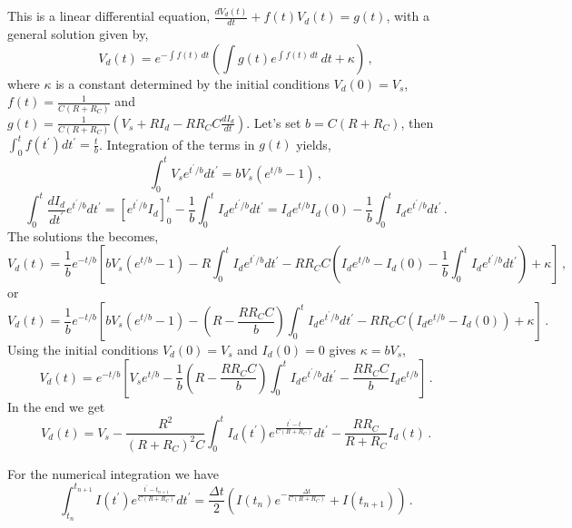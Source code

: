 \documentclass[a4paper,10pt]{article}
\numberwithin{equation}{section}
\begin{document}
This is a linear differential equation, \( \frac{d V_d(t)}{dt}+f(t)V_d(t)=g(t)\), with a general solution given by,
\begin{equation}
  V_d(t)=e^{-\int f(t)\,dt}\left(\int g(t)e^{\int f(t)\,dt}\,dt+\kappa \right)\, ,
\end{equation}
where \(\kappa\) is a constant determined by the initial conditions \(V_d(0) = V_s\),
\({ f(t) = \frac{1}{C(R+R_C)} }\) and\\ \(g(t) = \frac{1}{C(R+R_C)}\left( V_s + RI_d - RR_C C\frac{d I_d}{dt} \right)\).
Let's set \(b = C(R+R_C)\), then \(\int_0^t f(t^\prime) dt^\prime = \frac{t}{b}\).
Integration of the terms in \(g(t)\) yields,
\begin{equation}
  \int_0^t V_s e^{t^\prime/b} dt^\prime = bV_s(e^{t/b} - 1)\, ,
\end{equation}
\begin{equation}
  \int_0^t \frac{dI_d}{dt^\prime} e^{t^\prime/b} dt^\prime = \left[ e^{t^\prime/b}I_d \right]_0^t - \frac{1}{b}\int_0^t I_d e^{t^\prime/b} dt^\prime
  = I_d e^{t/b} I_d(0) - \frac{1}{b}\int_0^t I_d e^{t^\prime/b} dt^\prime\, .
\end{equation}
The solutions the becomes,
\begin{equation}
  V_d(t) = \frac{1}{b} e^{-t/b}\left[ bV_s\left( e^{t/b} - 1 \right) - R\int_0^t I_d e^{t^\prime/b}dt^\prime - RR_C C \left( I_d e^{t/b} -I_d(0) - \frac{1}{b}\int_0^t I_d e^{t^\prime/b} dt^\prime \right) + \kappa \right]\, ,
\end{equation}
or
\begin{equation}
  V_d(t) = \frac{1}{b} e^{-t/b}\left[ bV_s\left( e^{t/b} - 1 \right) - \left( R - \frac{RR_C C}{b} \right)\int_0^t I_d e^{t^\prime/b}dt^\prime - RR_C C \left( I_d e^{t/b} -I_d(0) \right) + \kappa \right]\, .
\end{equation}
Using the initial conditions \(V_d(0) = V_s\) and \(I_d(0) = 0\) gives \(\kappa = bV_s\),
\begin{equation}
  V_d(t) = e^{-t/b}\left[ V_s e^{t/b} - \frac{1}{b}\left( R - \frac{RR_C C}{b} \right)\int_0^t I_d e^{t^\prime/b}dt^\prime - \frac{RR_C C}{b} I_d e^{t/b} \right]\, .
\end{equation}
In the end we get
\begin{equation}
  V_d(t) = V_s - \frac{R^2}{(R+R_C)^2 C}\int_0^t I_d(t^\prime) e^{\frac{t^\prime-t}{C(R+R_C)}} dt^\prime - \frac{RR_C}{R+R_C}I_d(t) \, .
\end{equation}

For the numerical integration we have
\begin{equation}
  \int_{t_n}^{t_{n+1}} I(t^\prime) e^{\frac{t^\prime-t_{n+1}}{C(R+R_C)}} dt^\prime = \frac{\Delta t}{2}\left( I(t_n)e^{-\frac{\Delta t}{C(R+R_C)}} + I(t_{n+1}) \right)\, .
\end{equation}
\end{document}
